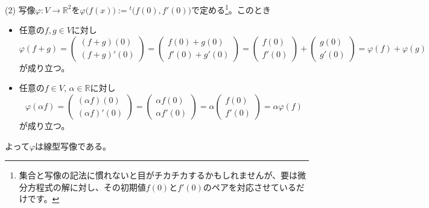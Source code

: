 \noindent (2) 写像$\varphi\colon V\rightarrow \mathbb{R}^2$を$\varphi\bigl( f(x) \bigr) := {}^t \bigl( f(0), f'(0) \bigr)$で定める\footnote{集合と写像の記法に慣れないと目がチカチカするかもしれませんが、要は微分方程式の解に対し、その初期値$f(0)$と$f'(0)$のペアを対応させているだけです。}。このとき
\begin{itemize}
\item 任意の$f, g \in V$に対し
\[
\varphi(f + g) = \begin{pmatrix} (f + g)(0) \\ (f + g)' (0) \end{pmatrix} = \begin{pmatrix} f(0) + g(0) \\ f'(0) + g'(0) \end{pmatrix} = \begin{pmatrix} f(0) \\ f'(0) \end{pmatrix} + \begin{pmatrix} g(0) \\ g'(0) \end{pmatrix} = \varphi(f) + \varphi(g)
\]
が成り立つ。
\item 任意の$f \in V$, $\alpha \in \mathbb{R}$に対し
\[
\varphi(\alpha f) = \begin{pmatrix} (\alpha f)(0) \\ (\alpha f)'(0) \end{pmatrix} = \begin{pmatrix} \alpha f(0) \\ \alpha f'(0) \end{pmatrix} = \alpha \begin{pmatrix} f(0) \\ f'(0) \end{pmatrix} = \alpha \varphi(f)
\]
が成り立つ。
\end{itemize}
よって$\varphi$は線型写像である。

